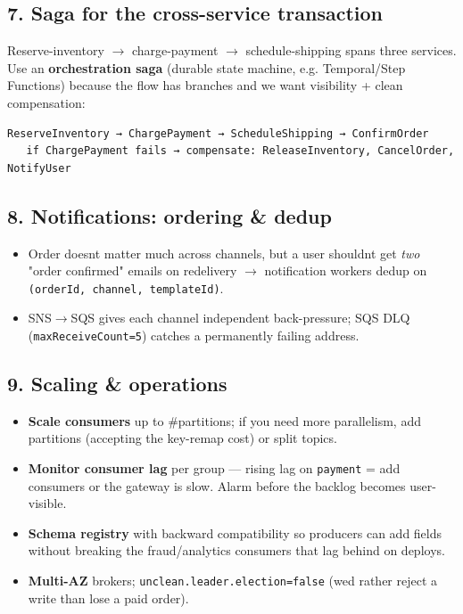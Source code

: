 \documentclass[11pt]{article}
\providecommand{\tightlist}{\setlength{\itemsep}{1pt}\setlength{\parskip}{0pt}}
\begin{document}
\subsection{7. Saga for the cross-service transaction}\label{7-saga-for-the-cross-service-transaction}

Reserve-inventory \(\rightarrow\) charge-payment \(\rightarrow\) schedule-shipping spans three services. Use an \textbf{orchestration saga} (durable state machine, e.g. Temporal/Step Functions) because the flow has branches and we want visibility + clean compensation:

\setcodelang{}

\begin{verbatim}
ReserveInventory → ChargePayment → ScheduleShipping → ConfirmOrder
   if ChargePayment fails → compensate: ReleaseInventory, CancelOrder, NotifyUser
\end{verbatim}

\subsection{8. Notifications: ordering \& dedup}\label{8-notifications-ordering--dedup}

\begin{itemize}
\tightlist
\item
  Order doesn\textquotesingle t matter much across channels, but a user shouldn\textquotesingle t get \emph{two} "order confirmed" emails on redelivery \(\rightarrow\) notification workers dedup on \texttt{(orderId,\ channel,\ templateId)}.
\item
  SNS\(\rightarrow\)SQS gives each channel independent back-pressure; SQS DLQ (\texttt{maxReceiveCount=5}) catches a permanently failing address.
\end{itemize}

\subsection{9. Scaling \& operations}\label{9-scaling--operations}

\begin{itemize}
\tightlist
\item
  \textbf{Scale consumers} up to \#partitions; if you need more parallelism, add partitions (accepting the key-remap cost) or split topics.
\item
  \textbf{Monitor consumer lag} per group --- rising lag on \texttt{payment} = add consumers or the gateway is slow. Alarm before the backlog becomes user-visible.
\item
  \textbf{Schema registry} with backward compatibility so producers can add fields without breaking the fraud/analytics consumers that lag behind on deploys.
\item
  \textbf{Multi-AZ} brokers; \texttt{unclean.leader.election=false} (we\textquotesingle d rather reject a write than lose a paid order).
\end{itemize}
\end{document}
